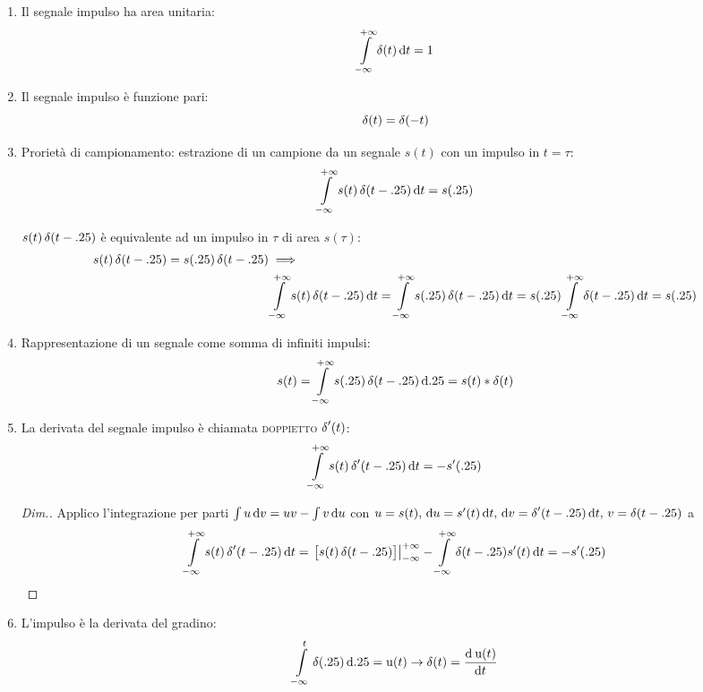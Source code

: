 \begin{enumerate}
	\item Il segnale impulso ha area unitaria:
	\begin{equation}
		\intinf{\impulse(t)}{t}=1
	\end{equation}
	\item Il segnale impulso è funzione pari:
	\begin{equation}
		\impulse(t)=\impulse(-t)
	\end{equation}
	\item Prorietà di campionamento: estrazione di un campione da un segnale $s(t)$ con un impulso in $t=\tau$:
	\begin{equation}
		\intinf{s(t)\impulse(t-\tau)}{t}=s(\tau)
	\end{equation}

	$s(t)\impulse(t-\tau)$ è equivalente ad un impulso in $\tau$ di area $s(\tau)$:
	\begin{align*}
		s(t)\impulse(t-\tau)=s(\tau)\impulse(t-\tau) &\implies \\
		& \intinf{s(t)\impulse(t-\tau)}{t} =\intinf{s(\tau)\impulse(t-\tau)}{t} = s(\tau)\intinf{\impulse(t-\tau)}{t} = s(\tau)
	\end{align*}

	\item Rappresentazione di un segnale come somma di infiniti impulsi:
	\begin{equation}
		s(t)=\intinf{s(\tau)\impulse(t-\tau)}{\tau}=s(t)\ast\impulse(t)
	\end{equation}

	\item La derivata del segnale impulso è chiamata \textsc{doppietto} $\impulse'(t)$:
	\begin{equation}
		\intinf{s(t)\impulse'(t-\tau)}{t}=-s'(\tau)
	\end{equation}

	\begin{proof}[Dim.]
		Applico l'integrazione per parti $\int{u\diff v}=u v-\int{v\diff u}$ con $u=s(t) ,\, \diff u=s'(t)\diff t ,\, \diff v=\impulse'(t-\tau)\diff t ,\, v=\impulse(t-\tau)$  a
		\[
			\intinf{s(t)\impulse'(t-\tau)}{t}= \restrict{\bigl[ s(t)\impulse(t-\tau)\bigr]}{-\infty}^{+\infty} -\intinf{\impulse(t-\tau)s'(t)}{t}=-s'(\tau)
		\]
	\end{proof}
	\item L'impulso è la derivata del gradino:
	\begin{equation}
		\intd{-\infty}{t}{\impulse(\tau)}{\tau}=\step(t) \to \impulse(t)=\deriv{\step(t)}{t}
	\end{equation}


\end{enumerate}
